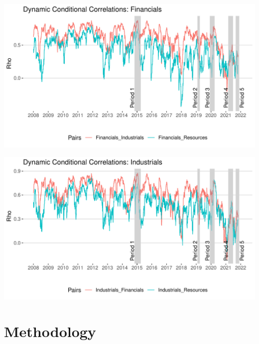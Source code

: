\documentclass[11pt,preprint, authoryear]{elsarticle}
\let\origfigure\figure
\let\endorigfigure\endfigure
\renewenvironment{figure}[1][2] {
    \expandafter\origfigure\expandafter[H]
} {
    \endorigfigure
}
\numberwithin{equation}{section}
\numberwithin{figure}{section}
\numberwithin{table}{section}
\begin{document}
\begin{figure}[H]

{\centering \includegraphics{Paper_files/figure-latex/DCCfullf-1} 

}

\caption{Dynamic Conditional Correlations: Financials \label{DCCfullf}}\label{fig:DCCfullf}
\end{figure}

\begin{figure}[H]

{\centering \includegraphics{Paper_files/figure-latex/DCCfulli-1} 

}

\caption{Dynamic Conditional Correlations: Industrials \label{DCCfulli}}\label{fig:DCCfulli}
\end{figure}

\hypertarget{methodology}{%
\section{\texorpdfstring{Methodology
\label{Meth}}{Methodology }}\label{methodology}}
\end{document}
